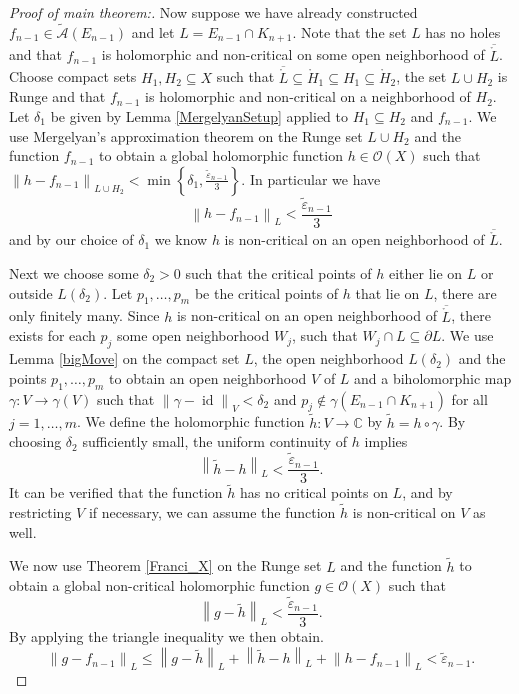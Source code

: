 \documentclass[a4paper,11pt]{amsart}
\newcommand{\C}{\mathbb C}
\newcommand{\set}[1]{\left\{#1\right\}}
\newcommand{\norm}[1]{\left\lVert#1\right\rVert}
\DeclareMathOperator{\id}{id}
\begin{document}
\begin{proof}[Proof of main theorem:]
    Now suppose we have already constructed $f_{n-1} \in \widetilde{\mathcal{A}}(E_{n-1})$ and let $L = E_{n-1} \cap K_{n+1}$.
    Note that the set $L$ has no holes and that $f_{n-1}$ is holomorphic and non-critical on some open neighborhood of $\overline{\mathring{L}}$.
    Choose compact sets $H_1, H_2 \subseteq X$ such that $\overline{\mathring{L}} \subseteq \mathring{H}_1 \subseteq H_1 \subseteq \mathring{H}_2$, 
    the set $L \cup H_2$ is Runge and that $f_{n-1}$ is holomorphic and non-critical on a neighborhood of $H_2$. 
    Let $\delta_1$ be given by Lemma \ref{MergelyanSetup} applied to $H_1 \subseteq H_2$ and $f_{n-1}$.
    We use Mergelyan's approximation theorem on the Runge set $L \cup H_2$ and the function $f_{n-1}$ to obtain a global holomorphic function $h \in \mathcal{O}(X)$ such that $\norm{h-f_{n-1}}_{L \cup H_2} < \min \set{\delta_1, \frac{\tilde{\varepsilon}_{n-1}}{3}}$.
    In particular we have 
    \[\norm{h-f_{n-1}}_{L} < \frac{\tilde{\varepsilon}_{n-1}}{3}\]
    and by our choice of $\delta_1$ we know $h$ is non-critical on an open neighborhood of $\overline{\mathring{L}}$.  
    
    Next we choose some $\delta_2 > 0$ such that the critical points of $h$ either lie on $L$ or outside $L(\delta_2)$.
    Let $p_1, \ldots, p_m$ be the critical points of $h$ that lie on $L$, there are only finitely many.
    Since $h$ is non-critical on an open neighborhood of $\overline{\mathring{L}}$, there exists for each $p_j$ some open neighborhood $W_j$, such that $W_j \cap L \subseteq \partial L$.
    We use Lemma \ref{bigMove} on the compact set $L$, the open neighborhood $L(\delta_2)$ and the points $p_1, \ldots, p_m$
    to obtain an open neighborhood $V$ of $L$ and a biholomorphic map $\gamma \colon V \to \gamma(V)$ such that $\norm{\gamma - \id}_V < \delta_2$ and $p_j \notin \gamma(E_{n-1} \cap K_{n+1})$ for all $j = 1,\ldots, m$.
    We define the holomorphic function $\tilde{h} \colon V \to \C$ by $\tilde{h} = h \circ \gamma$.
    By choosing $\delta_2$ sufficiently small, the uniform continuity of $h$ implies
    \[\norm{\tilde{h}-h}_{L} < \frac{\tilde{\varepsilon}_{n-1}}{3}.\]
    It can be verified that the function $\tilde{h}$ has no critical points on $L$, and by restricting $V$ if necessary, 
    we can assume the function $\tilde{h}$ is non-critical on $V$ as well. 

    We now use Theorem \ref{Franci_X} on the Runge set $L$ and the function $\tilde{h}$ to obtain a global non-critical holomorphic function $g \in \mathcal{O}(X)$ such that 
    \[\norm{g-\tilde{h}}_{L} < \frac{\tilde{\varepsilon}_{n-1}}{3}.\]
    By applying the triangle inequality we then obtain.
    \[\norm{g - f_{n-1}}_{L} \le \norm{g - \tilde{h}}_{L} + \norm{\tilde{h} - h}_{L} + \norm{h-f_{n-1}}_{L} < \tilde{\varepsilon}_{n-1}.\] 
   

\end{proof}
\end{document}
